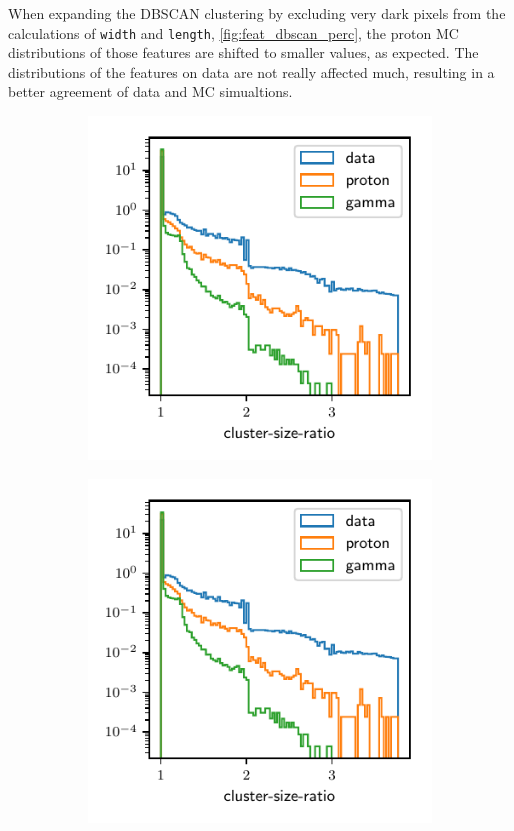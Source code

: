 When expanding the DBSCAN clustering by excluding very dark pixels from the
calculations of \texttt{width} and \texttt{length},
\autoref{fig:feat_dbscan_perc}, the proton MC distributions of those features
are shifted to smaller values, as expected. The distributions of the features
on data are not really affected much, resulting in a better agreement of data
and MC simualtions.
%
\begin{figure}
  \begin{subfigure}{0.5\textwidth}
    \centering
    \includegraphics[width=\textwidth, page=23]{Plots/data_mc/features_DBSCAN.pdf}
  \end{subfigure}
  \begin{subfigure}{0.5\textwidth}
    \centering
    \includegraphics[width=\textwidth, page=13]{Plots/data_mc/features_DBSCAN.pdf}

\end{subfigure}
\end{figure}
